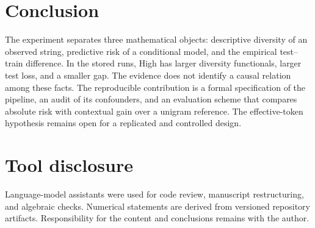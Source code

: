 \documentclass[11pt]{article}
\newcommand{\1}{\mathbf 1}
\begin{document}
\section{Conclusion}

The experiment separates three mathematical objects: descriptive diversity of
an observed string, predictive risk of a conditional model, and the empirical
test--train difference. In the stored runs, High has larger diversity
functionals, larger test loss, and a smaller gap. The evidence does not identify
a causal relation among these facts. The reproducible contribution is a formal
specification of the pipeline, an audit of its confounders, and an evaluation
scheme that compares absolute risk with contextual gain over a unigram
reference. The effective-token hypothesis remains open for a replicated and
controlled design.

\section*{Tool disclosure}
Language-model assistants were used for code review, manuscript restructuring,
and algebraic checks. Numerical statements are derived from versioned repository
artifacts. Responsibility for the content and conclusions remains with the
author.

{\small


}
\end{document}
